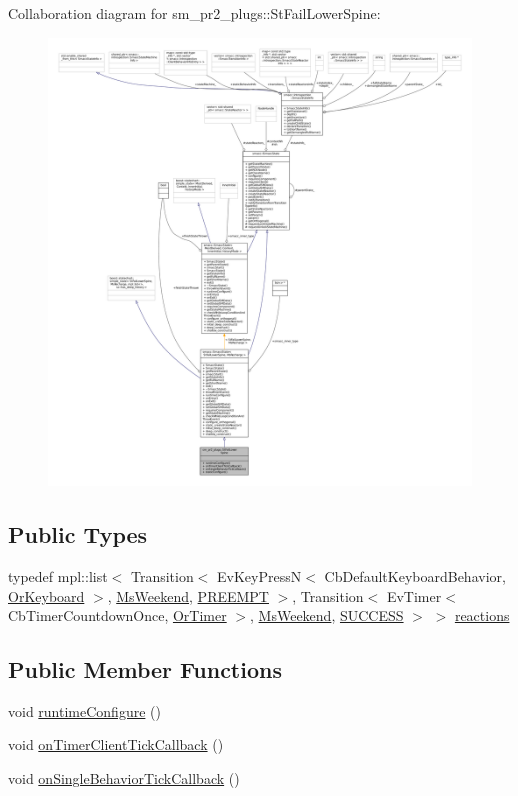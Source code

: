 Collaboration diagram for sm\+\_\+pr2\+\_\+plugs\+:\+:St\+Fail\+Lower\+Spine\+:
\nopagebreak
\begin{figure}[H]
\begin{center}
\leavevmode
\includegraphics[width=350pt]{structsm__pr2__plugs_1_1StFailLowerSpine__coll__graph}
\end{center}
\end{figure}
\subsection*{Public Types}
\begin{DoxyCompactItemize}
\item 
typedef mpl\+::list$<$ Transition$<$ Ev\+Key\+PressN$<$ Cb\+Default\+Keyboard\+Behavior, \hyperlink{classsm__pr2__plugs_1_1OrKeyboard}{Or\+Keyboard} $>$, \hyperlink{classsm__pr2__plugs_1_1MsWeekend}{Ms\+Weekend}, \hyperlink{classPREEMPT}{P\+R\+E\+E\+M\+PT} $>$, Transition$<$ Ev\+Timer$<$ Cb\+Timer\+Countdown\+Once, \hyperlink{classsm__pr2__plugs_1_1OrTimer}{Or\+Timer} $>$, \hyperlink{classsm__pr2__plugs_1_1MsWeekend}{Ms\+Weekend}, \hyperlink{classSUCCESS}{S\+U\+C\+C\+E\+SS} $>$ $>$ \hyperlink{structsm__pr2__plugs_1_1StFailLowerSpine_ae8fc8574db23666fd11dfac422ad598a}{reactions}
\end{DoxyCompactItemize}
\subsection*{Public Member Functions}
\begin{DoxyCompactItemize}
\item 
void \hyperlink{structsm__pr2__plugs_1_1StFailLowerSpine_af368b88521b53cb5b46dc68a2dffa036}{runtime\+Configure} ()
\item 
void \hyperlink{structsm__pr2__plugs_1_1StFailLowerSpine_add90ff06e4fa2743017927b67e274c95}{on\+Timer\+Client\+Tick\+Callback} ()
\item 
void \hyperlink{structsm__pr2__plugs_1_1StFailLowerSpine_aff67cab227312476a56bb92261d88e3b}{on\+Single\+Behavior\+Tick\+Callback} ()
\end{DoxyCompactItemize}
